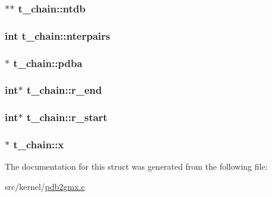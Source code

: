 \hypertarget{structt__chain_afd407f62aaa7357100b0b78c727f8a56}{
\subsubsection[{ntdb}]{$\ast$$\ast$ {\bf t\-\_\-chain\-::ntdb}}}\label{structt__chain_afd407f62aaa7357100b0b78c727f8a56}
\hypertarget{structt__chain_a75f29567fd1b723c07298a4ee64852b9}{
\subsubsection[{nterpairs}]{\setlength{\rightskip}{0pt plus 5cm}int {\bf t\-\_\-chain\-::nterpairs}}}\label{structt__chain_a75f29567fd1b723c07298a4ee64852b9}
\hypertarget{structt__chain_ad8097c9e0941737f3e186223f5333b08}{
\subsubsection[{pdba}]{$\ast$ {\bf t\-\_\-chain\-::pdba}}}\label{structt__chain_ad8097c9e0941737f3e186223f5333b08}
\hypertarget{structt__chain_a18e2c59ffed85780b50e23e1a7b843a9}{
\subsubsection[{r\-\_\-end}]{\setlength{\rightskip}{0pt plus 5cm}int$\ast$ {\bf t\-\_\-chain\-::r\-\_\-end}}}\label{structt__chain_a18e2c59ffed85780b50e23e1a7b843a9}
\hypertarget{structt__chain_af86259dae09b297b0587d7eff4e633b7}{
\subsubsection[{r\-\_\-start}]{\setlength{\rightskip}{0pt plus 5cm}int$\ast$ {\bf t\-\_\-chain\-::r\-\_\-start}}}\label{structt__chain_af86259dae09b297b0587d7eff4e633b7}
\hypertarget{structt__chain_a0061c01a06b1ee38d4c55092c20469ae}{
\subsubsection[{x}]{$\ast$ {\bf t\-\_\-chain\-::x}}}\label{structt__chain_a0061c01a06b1ee38d4c55092c20469ae}


\-The documentation for this struct was generated from the following file\-:\begin{DoxyCompactItemize}
\item 
src/kernel/\hyperlink{pdb2gmx_8c}{pdb2gmx.\-c}\end{DoxyCompactItemize}
